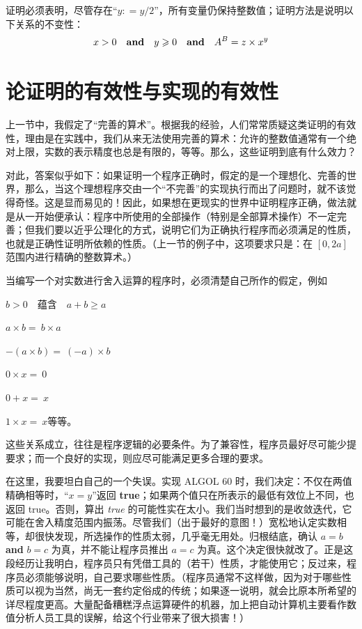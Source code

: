 证明必须表明，尽管存在“$y: = y/2$”，所有变量仍保持整数值；证明方法是说明以下关系的不变性：
$$
x > 0\quad \text{\textbf{and}}\quad y \geqslant 0\quad \text{\textbf{and}}\quad A^B = z \times x^y
$$

\section[论证明的有效性与实现的有效性]{论证明的有效性与实现的有效性}

上一节中，我假定了“完善的算术”。根据我的经验，人们常常质疑这类证明的有效性，理由是在实践中，我们从来无法使用完善的算术：允许的整数值通常有一个绝对上限，实数的表示精度也总是有限的，等等。那么，这些证明到底有什么效力？

对此，答案似乎如下：如果证明一个程序正确时，假定的是一个理想化、完善的世界，那么，当这个理想程序交由一个“不完善”的实现执行而出了问题时，就不该觉得奇怪。这是显而易见的！因此，如果想在更现实的世界中证明程序正确，做法就是从一开始便承认：程序中所使用的全部操作（特别是全部算术操作）不一定完善；但我们要以近乎公理化的方式，说明它们为正确执行程序而必须满足的性质，也就是正确性证明所依赖的性质。（上一节的例子中，这项要求只是：在 $[0, 2a]$ 范围内进行精确的整数算术。）

当编写一个对实数进行舍入运算的程序时，必须清楚自己所作的假定，例如
\smallskip

\tabto*{10em}$b > 0\quad \text{蕴含}\quad a + b \geqslant a$

\tabto*{10em}$a\times b =\ b\times a$

\tabto*{10em}$-(a \times  b) =\ (-a)\times b$

\tabto*{10em}$0\times  x =\ 0$

\tabto*{10em}$0 + x =\ x$

\tabto*{10em}$1\times x =\ x$\quad 等等。
\smallskip

这些关系成立，往往是程序逻辑的必要条件。为了兼容性，程序员最好尽可能少提要求；而一个良好的实现，则应尽可能满足更多合理的要求。

在这里，我要坦白自己的一个失误。实现 ALGOL 60 时，我们决定：不仅在两值精确相等时，“$x = y$”返回 \textbf{true}；如果两个值只在所表示的最低有效位上不同，也返回 true。否则，算出 \textit{true} 的可能性实在太小。我们当时想到的是收敛迭代，它可能在舍入精度范围内振荡。尽管我们（出于最好的意图！）宽松地认定实数相等，却很快发现，所选操作的性质太弱，几乎毫无用处。归根结底，确认 $a = b$ \textbf{and} $b = c$ 为真，并不能让程序员推出 $a = c$ 为真。这个决定很快就改了。正是这段经历让我明白，程序员只有凭借工具的（若干）性质，才能使用它；反过来，程序员必须能够说明，自己要求哪些性质。（程序员通常不这样做，因为对于哪些性质可以视为当然，尚无一套约定俗成的传统；如果逐一说明，就会比原本所希望的详尽程度更高。大量配备糟糕浮点运算硬件的机器，加上把自动计算机主要看作数值分析人员工具的误解，给这个行业带来了很大损害！）

